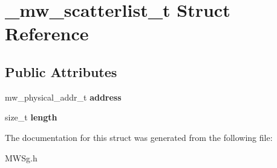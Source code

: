 \hypertarget{struct__mw__scatterlist__t}{\section{\-\_\-mw\-\_\-scatterlist\-\_\-t Struct Reference}
\label{struct__mw__scatterlist__t}
}
\subsection*{Public Attributes}
\begin{DoxyCompactItemize}
\item 
\hypertarget{struct__mw__scatterlist__t_a3332f09422d9f77ca2817ae0238445a3}{mw\-\_\-physical\-\_\-addr\-\_\-t {\bfseries address}}\label{struct__mw__scatterlist__t_a3332f09422d9f77ca2817ae0238445a3}

\item 
\hypertarget{struct__mw__scatterlist__t_a005992def1b49a6fc22d7599a4a124b1}{size\-\_\-t {\bfseries length}}\label{struct__mw__scatterlist__t_a005992def1b49a6fc22d7599a4a124b1}

\end{DoxyCompactItemize}


The documentation for this struct was generated from the following file\-:\begin{DoxyCompactItemize}
\item 
M\-W\-Sg.\-h\end{DoxyCompactItemize}
